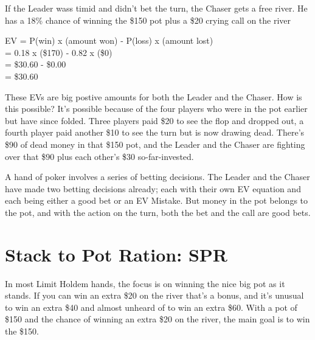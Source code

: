 If the Leader wass timid and didn't bet the turn, the Chaser gets a
free river. He has a 18\% chance of winning the \$150 pot plus a \$20
crying call on the river

EV = P(win) x (amount won) - P(loss) x (amount lost) \\
   = 0.18 x (\$170) - 0.82 x (\$0) \\
   = \$30.60 - \$0.00 \\
   = \$30.60


These EVs are big postive amounts for both the Leader and the
Chaser. How is this possible? It's possible because of the four
players who were in the pot earlier but have since folded. Three
players paid \$20 to see the flop and dropped out, a fourth player
paid another \$10 to see the turn but is now drawing dead. There's
\$90 of dead money in that \$150 pot, and the Leader and the Chaser
are fighting over that \$90 plus each other's \$30 so-far-invested.

A hand of poker involves a series of betting decisions. The Leader and
the Chaser have made two betting decisions already; each with their
own EV equation and each being either a good bet or an EV Mistake. But
money in the pot belongs to the pot, and with the action on the turn,
both the bet and the call are good bets.

\section{Stack to Pot Ration: SPR}

In most Limit Holdem hands, the focus is on winning the nice big pot
as it stands. If you can win an extra \$20 on the river that's a
bonus, and it's unusual to win an extra \$40 and almost unheard of to
win an extra \$60. With a pot of \$150 and the chance of winning an
extra \$20 on the river, the main goal is to win the \$150.

